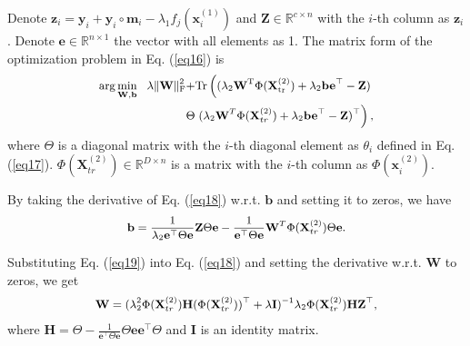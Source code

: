 \documentclass[10pt,journal,compsoc]{IEEEtran}
\begin{document}
Denote $\mathbf{z}_i = \mathbf{y}_i+\mathbf{y}_i \circ \mathbf{m}_i-\lambda_1 f_j(\mathbf{x}_i^{(1)})$ and $\mathbf{Z} \in \mathbb{R}^{c\times n}$ with the $i$-th column as $\mathbf{z}_i$. Denote $\mathbf{e} \in \mathbb{R}^{n\times 1}$ the vector with all elements as 1. The matrix form of the optimization problem in Eq. (\ref{eq16}) is
\begin{equation}
\label{eq18}
\small{
\begin{split}
 \arg \min_{\mathbf{W},\mathbf{b}}~~\lambda \|\mathbf{W}\|_{\rm{F}}^{2} +  & \rm{Tr} \left( (\lambda_2 \mathbf{W}^T \Phi(\mathbf{X}_{tr}^{(2)})+ \lambda_2 \mathbf{b}\mathbf{e}^\top-\mathbf{Z})  \right.\\
  \Theta & \left. ( \lambda_2 \mathbf{W}^T \Phi(\mathbf{X}_{tr}^{(2)})+ \lambda_2 \mathbf{b}\mathbf{e}^\top-\mathbf{Z})^\top\right),
\end{split}}
\end{equation}
where $\Theta$ is a diagonal matrix with the $i$-th diagonal element as $\theta_i$ defined in Eq. (\ref{eq17}). $\Phi(\mathbf{X}_{tr}^{(2)}) \in \mathbb{R}^ {D\times n}$ is a matrix with the $i$-th column as $\Phi(\mathbf{x}_i^{(2)})$.

By taking the derivative of Eq. (\ref{eq18}) w.r.t. $\mathbf{b}$ and setting it to zeros, we have
\begin{equation}
\label{eq19}
\small{
\begin{split}
\mathbf{b} = \frac{1}{\lambda_2 \mathbf{e}^\top \Theta \mathbf{e}} \mathbf{Z} \Theta \mathbf{e} - \frac{1}{\mathbf{e}^\top \Theta \mathbf{e}} \mathbf{W}^T \Phi(\mathbf{X}_{tr}^{(2)}) \Theta \mathbf{e}.
\end{split}}
\end{equation}

Substituting Eq. (\ref{eq19}) into Eq. (\ref{eq18}) and setting the derivative w.r.t. $\mathbf{W}$ to zeros, we get
\begin{equation}
\label{eq20}
\small{
\begin{split}
\mathbf{W} = (\lambda_2^2 \Phi(\mathbf{X}_{tr}^{(2)}) \mathbf{H} (\Phi(\mathbf{X}_{tr}^{(2)}))^\top +\lambda\mathbf{I})^{-1} \lambda_2 \Phi(\mathbf{X}_{tr}^{(2)}) \mathbf{H}\mathbf{Z}^\top,
\end{split}}
\end{equation}
where $\mathbf{H}= \Theta -\frac{1}{\mathbf{e}^\top \Theta \mathbf{e}} \Theta \mathbf{e} \mathbf{e}^\top \Theta$ and $\mathbf{I}$ is an identity matrix.
\end{document}
